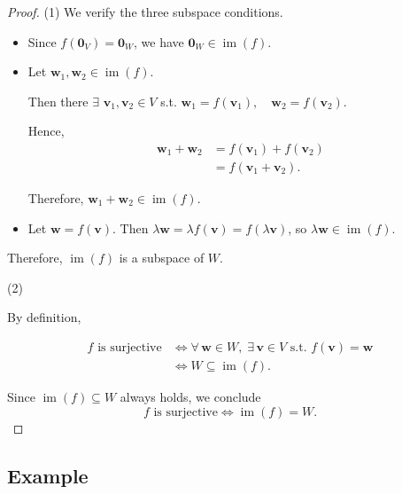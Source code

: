 \documentclass[12pt]{article}
\begin{document}
\begin{proof}

(1) We verify the three subspace conditions.

\begin{itemize}
    \item {}

    Since $f(\mathbf{0}_V)=\mathbf{0}_W$, we have $\mathbf{0}_W\in\operatorname{im}(f)$.

    \item {}

    Let $\mathbf{w}_1,\mathbf{w}_2 \in \operatorname{im}(f)$.

    Then there $\exists$ $\mathbf{v}_1,\mathbf{v}_2\in V$ s.t. $\mathbf{w}_1=f(\mathbf{v}_1),\quad\mathbf{w}_2=f(\mathbf{v}_2)$.

    Hence,
    \[
    \begin{aligned}
    \mathbf{w}_1+\mathbf{w}_2
    &=
    f(\mathbf{v}_1)+f(\mathbf{v}_2)\\
    &=
    f(\mathbf{v}_1+\mathbf{v}_2).
    \end{aligned}
    \]

    Therefore, $\mathbf{w}_1+\mathbf{w}_2\in\operatorname{im}(f)$.

    \item {}

    Let $\mathbf{w}=f(\mathbf{v})$. Then $\lambda\mathbf{w}=\lambda f(\mathbf{v})=f(\lambda\mathbf{v})$, so $\lambda\mathbf{w}\in\operatorname{im}(f)$.
\end{itemize}

Therefore, $\operatorname{im}(f)$ is a subspace of $W$.

\medskip

(2)

By definition,

\[
\begin{aligned}
f \text{ is surjective}
&\iff
\forall\,\mathbf{w}\in W,\;
\exists\,\mathbf{v}\in V
\text{ s.t. } f(\mathbf{v})=\mathbf{w}\\
&\iff
W\subseteq\operatorname{im}(f).   
\end{aligned}
\]

Since $\operatorname{im}(f)\subseteq W$ always holds, we conclude
\[
f
\text{ is surjective}
\iff
\operatorname{im}(f)=W.
\]

\end{proof}

\subsection{Example}
\end{document}
